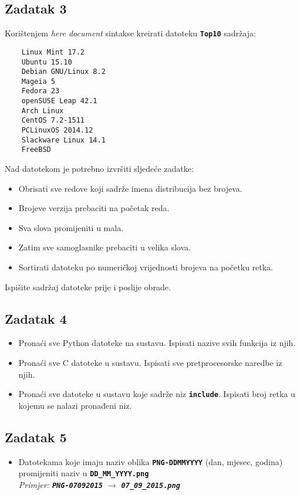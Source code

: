\documentclass[12pt,a4paper]{article}
\newcommand{\shell}[1]{\texttt{\textbf{#1}}}
\begin{document}
	\subsection*{Zadatak 3}
	Korištenjem \textit{here document} sintakse kreirati datoteku \shell{Top10} sadržaja:
	\begin{verbatim}
	Linux Mint 17.2
	Ubuntu 15.10
	Debian GNU/Linux 8.2
	Mageia 5
	Fedora 23
	openSUSE Leap 42.1
	Arch Linux
	CentOS 7.2-1511
	PCLinuxOS 2014.12
	Slackware Linux 14.1
	FreeBSD
	\end{verbatim}
	Nad datotekom je potrebno izvršiti sljedeće zadatke:
	\begin{itemize}
		\item Obrisati sve redove koji sadrže imena distribucija bez brojeva.
		\item Brojeve verzija prebaciti na početak reda.
		\item Sva slova promijeniti u mala.
		\item Zatim sve samoglasnike prebaciti u velika slova.
		\item Sortirati datoteku po numeričkoj vrijednosti brojeva na početku retka.
	\end{itemize}
	Ispišite sadržaj datoteke prije i poslije obrade.
  
	\subsection*{Zadatak 4}
	\begin{itemize}
		\item Pronaći sve Python datoteke na sustavu. Ispisati nazive svih funkcija iz njih.
		\item Pronaći sve C datoteke u sustavu. Ispisati sve pretprocesorske naredbe iz njih.
		\item Pronaći sve datoteke u sustavu koje sadrže niz \shell{include}. Ispisati broj retka u kojemu se nalazi pronađeni niz.
	\end{itemize}
  
	\subsection*{Zadatak 5}
	\begin{itemize}
    \item Datotekama koje imaju naziv oblika \shell{PNG-DDMMYYYY} (dan, mjesec, godina) promijeniti naziv u \shell{DD\_MM\_YYYY.png} \\ \textit{Primjer: \shell{PNG-07092015} $\longrightarrow$ \shell{07\_09\_2015.png}}
	\end{itemize}
\end{document}
